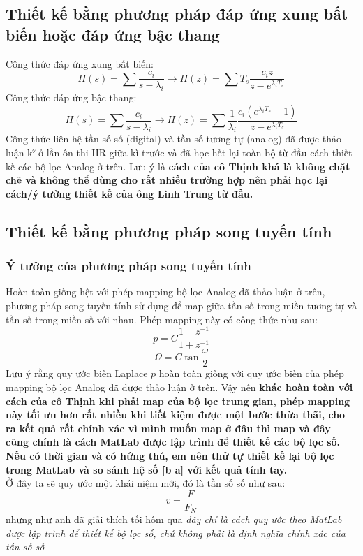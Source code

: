 \documentclass{article}
\begin{document}
\subsection{Thiết kế bằng phương pháp đáp ứng xung bất biến hoặc đáp ứng bậc thang}
Công thức đáp ứng xung bất biến:
$$H(s)=\sum\frac{c_{i}}{s-\lambda_{i}} \rightarrow H(z)=\sum T_{s}\frac{c_{i}z}{z-e^{\lambda_{i}T_{s}}}$$
Công thức đáp ứng bậc thang:
$$H(s)=\sum\frac{c_{i}}{s-\lambda_{i}} \rightarrow H(z)=\sum \frac{1}{\lambda_{i}}\frac{c_{i}(e^{\lambda_{i}T_{s}}-1)}{z-e^{\lambda_{i}T_{s}}}$$
Công thức liên hệ tần số số (digital) và tần số tương tự (analog) đã được thảo luận kĩ ở lần ôn thi IIR giữa kì trước và đã học hết lại toàn bộ từ
đầu cách thiết kế các bộ lọc Analog ở trên. Lưu ý là \textbf{cách của cô Thịnh khá là không chặt chẽ và không thể dùng cho rất nhiều trường hợp nên phải học lại cách/ý tưởng thiết kế của ông Linh Trung từ đầu.}
\subsection{Thiết kế bằng phương pháp song tuyến tính}
\subsubsection{Ý tưởng của phương pháp song tuyến tính}
Hoàn toàn giống hệt với phép mapping bộ lọc Analog đã thảo luận ở trên, phương pháp song tuyến tính sử dụng để map giữa tần số trong miền tương tự và tần số
trong miền số với nhau.
Phép mapping này có công thức như sau:
$$p=C\frac{1-z^{-1}}{1+z^{-1}}$$ $$\Omega=C\tan{\frac{\omega}{2}}$$
Lưu ý rằng quy ước biến Laplace $p$ hoàn toàn giống với quy ước biến của phép mapping bộ lọc Analog đã được thảo luận ở trên. Vậy nên
\textbf{khác hoàn toàn với cách của cô Thịnh khi phải map của bộ lọc trung gian, phép mapping này tối ưu hơn rất nhiều khi tiết kiệm được một bước thừa thãi, cho ra kết quả rất chính xác vì mình muốn map ở đâu thì map và đây cũng chính
là cách MatLab được lập trình để thiết kế các bộ lọc số. Nếu có thời gian và có hứng thú, em nên thử tự thiết kế lại bộ lọc trong MatLab và so sánh hệ số [b a] với kết quả tính tay.}
\\ Ở đây ta sẽ quy ước một khái niệm mới, đó là tần số số như sau:
$$v=\frac{F}{F_{N}}$$
nhưng như anh đã giải thích tối hôm qua \textit{đây chỉ là cách quy ước theo MatLab được lập trình để thiết kế bộ lọc số, chứ không phải là định nghĩa chính xác của tần số số}
\end{document}

